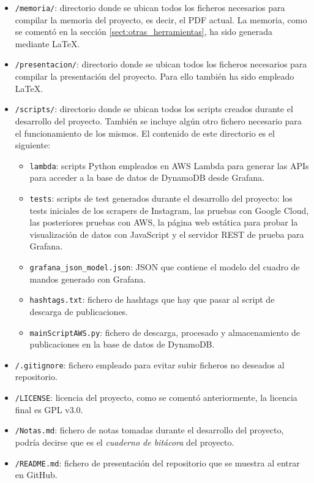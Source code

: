 \begin{itemize}
    \item \texttt{/memoria/}: directorio donde se ubican todos los ficheros necesarios para compilar la memoria del proyecto, es decir, el PDF actual. La memoria, como se comentó en la sección \ref{sect:otras_herramientas}, ha sido generada mediante \LaTeX.
    \item \texttt{/presentacion/}: directorio donde se ubican todos los ficheros necesarios para compilar la presentación del proyecto. Para ello también ha sido empleado \LaTeX.
    \item \texttt{/scripts/}: directorio donde se ubican todos los scripts creados durante el desarrollo del proyecto. También se incluye algún otro fichero necesario para el funcionamiento de los mismos. El contenido de este directorio es el siguiente:
    
    \begin{figure}[H]
        \centering
        \begin{minipage}{7cm}
        \end{minipage}
    \end{figure}
    
    \begin{itemize}
        \item \texttt{lambda}: scripts Python empleados en AWS Lambda para generar las APIs para acceder a la base de datos de DynamoDB desde Grafana.
        \item \texttt{tests}: scripts de test generados durante el desarrollo del proyecto: los tests iniciales de los scrapers de Instagram, las pruebas con Google Cloud, las posteriores pruebas con AWS, la página web estática para probar la visualización de datos con JavaScript y el servidor REST de prueba para Grafana.
        \item \texttt{grafana\_json\_model.json}: JSON que contiene el modelo del cuadro de mandos generado con Grafana.
        \item \texttt{hashtags.txt}: fichero de hashtags que hay que pasar al script de descarga de publicaciones.
        \item \texttt{mainScriptAWS.py}: fichero de descarga, procesado y almacenamiento de publicaciones en la base de datos de DynamoDB.
    \end{itemize}
    \item \texttt{/.gitignore}: fichero empleado para evitar subir ficheros no deseados al repositorio.
    \item \texttt{/LICENSE}: licencia del proyecto, como se comentó anteriormente, la licencia final es GPL v3.0.
    \item \texttt{/Notas.md}: fichero de notas tomadas durante el desarrollo del proyecto, podría decirse que es el \textit{cuaderno de bitácora} del proyecto.
    \item \texttt{/README.md}: fichero de presentación del repositorio que se muestra al entrar en GitHub.
\end{itemize}

